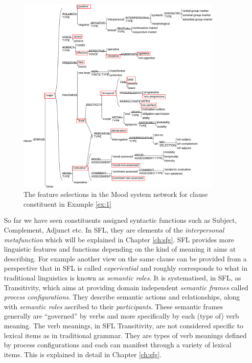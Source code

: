     \begin{figure}[!ht]
        \centering      
        \includegraphics[width=0.91\textwidth]{Figures/Example/mood-selections.pdf}      
        \caption{The feature selections in the Mood system network for clause constituent in Example \ref{ex:1}}
        \label{fig:mood-selections}
    \end{figure}
    
    So far we have seen constituents assigned syntactic functions such as Subject, Complement, Adjunct etc. In SFL, they are elements of the \textit{interpersonal metafunction} which will be explained in Chapter \ref{ch:sfg}. SFL provides more linguistic features and functions depending on the kind of meaning it aims at describing. 
    For example another view on the same clause can be provided from a perspective that in SFL is called \textit{experiential} and roughly corresponds to what in traditional linguistics is known as \textit{semantic roles}. It is systematised, in SFL, as Transitivity, which aims at providing domain independent \textit{semantic frames} called \textit{process configurations}. They describe semantic actions and relationships, along with \textit{semantic roles} ascribed to their \textit{participants}. These semantic frames generally are ``governed'' by verbs and more specifically by each (type of) verb meaning. The verb meanings, in SFL Transitivity, are not considered specific to lexical items as in traditional grammar. They are types of verb meanings defined by process configurations and each can manifest through a variety of lexical items. This is explained in detail in Chapter \ref{ch:sfg}.
    
